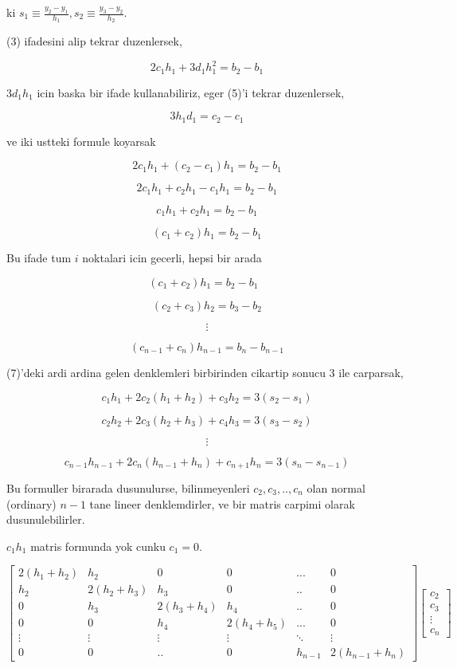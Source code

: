 \documentclass[12pt,fleqn]{article}\usepackage{../common}
\begin{document}
ki $s_1 \equiv \frac{y_2 - y_1}{h_1}, s_2 \equiv \frac{y_3 - y_2}{h_2}$. 

(3) ifadesini alip tekrar duzenlersek, 

$$  2c_1h_1 + 3d_1h_1^2  = b_2 - b_1$$

$3d_1h_1$ icin baska bir ifade kullanabiliriz, eger (5)'i tekrar
duzenlersek,

$$ 3h_1d_1 = c_2 - c_1$$

ve iki ustteki formule koyarsak

$$  2c_1h_1 + (c_2 - c_1)h_1  = b_2 - b_1$$

$$  2c_1h_1 + c_2h_1 - c_1h_1  = b_2 - b_1$$

$$  c_1h_1 + c_2h_1  = b_2 - b_1$$

$$  (c_1 + c_2) h_1  = b_2 - b_1$$

Bu ifade tum $i$ noktalari icin gecerli, hepsi bir arada

$$  (c_1 + c_2) h_1  = b_2 - b_1 \ \ \ \label{6}$$

$$  (c_2 + c_3) h_2  = b_3 - b_2$$

$$ \vdots $$

$$  (c_{n-1} + c_n) h_{n-1}  = b_n - b_{n-1}$$

(7)'deki ardi ardina gelen denklemleri birbirinden cikartip sonucu 3 ile
carparsak, 

$$ c_1h_1 + 2c_2(h_1 + h_2) + c_3h_2 = 3(s_2 - s_1) $$

$$ c_2h_2 + 2c_3(h_2 + h_3) + c_4h_3 = 3(s_3 - s_2) $$

$$ \vdots $$

$$ c_{n-1}h_{n-1} + 2c_n(h_{n-1} + h_{n}) + c_{n+1}h_n = 3(s_n - s_{n-1}) $$

Bu formuller birarada dusunulurse, bilinmeyenleri $c_2,c_3,..,c_n$ olan
normal (ordinary) $n-1$ tane lineer denklemdirler, ve bir matris carpimi
olarak dusunulebilirler. 

$c_1h_1$ matris formunda yok cunku $c_1=0$. 

$$ 
\left[\begin{array}{cccccc}
2(h_1+h_2) & h_2 & 0 & 0 & ... & 0 \\
h_2 & 2(h_2+h_3) & h_3 & 0 & .. & 0  \\
0 & h_3 & 2(h_3+h_4) & h_4 & .. & 0 \\
0 & 0 & h_4 & 2(h_4+h_5) & ... & 0 \\
\vdots & \vdots & \vdots & \vdots & \ddots & \vdots  \\
0 & 0 & .. & 0 & h_{n-1} & 2(h_{n-1}+h_n) 
\end{array}\right]
\left[\begin{array}{r}
c_2 \\ c_3 \\ \vdots \\ c_n
\end{array}\right]
 $$
\end{document}
